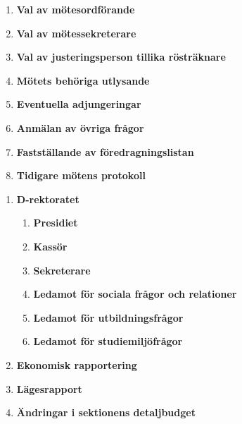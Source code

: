 \documentclass{protokoll}
\begin{document}
\begin{motesfakta} %
  \narvarande
\end{motesfakta}




  \begin{enumerate}
    \item\textbf{Val av mötesordförande}
    \item\textbf{Val av mötessekreterare}
    \item\textbf{Val av justeringsperson tillika rösträknare}
    \item\textbf{Mötets behöriga utlysande}
    \item\textbf{Eventuella adjungeringar}
    \item\textbf{Anmälan av övriga frågor}
    \item\textbf{Fastställande av föredragningslistan}
    \item\textbf{Tidigare mötens protokoll}
  \end{enumerate}


  \begin{enumerate}
    \item \textbf{D-rektoratet}
      \begin{enumerate}
        \item \textbf{Presidiet}
        \item \textbf{Kassör}
        \item \textbf{Sekreterare}
        \item \textbf{Ledamot för sociala frågor och relationer}
        \item \textbf{Ledamot för utbildningsfrågor}
        \item \textbf{Ledamot för studiemiljöfrågor}
      \end{enumerate}
    \item \textbf{Ekonomisk rapportering}
        \item \textbf{Lägesrapport}
        \item \textbf{Ändringar i sektionens detaljbudget}
  \end{enumerate}
\end{document}
